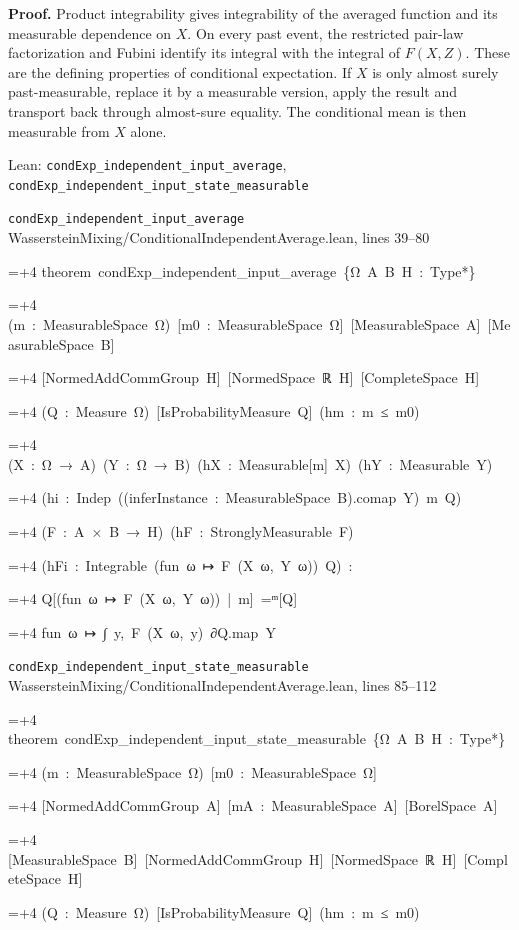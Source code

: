 \documentclass[11pt,a4paper]{report}
\newlength{\leancharwidth}
\newenvironment{leancode}{\par\smallskip\begingroup\ttfamily\footnotesize\raggedright
  \settowidth{\leancharwidth}{M}\setlength{\parskip}{0pt}\setlength{\parindent}{0pt}
  \frenchspacing}{\par\endgroup\smallskip}
\newcommand{\leanline}[2]{\hangindent=\dimexpr#1\leancharwidth+4\leancharwidth\relax
  \hangafter=1\noindent\hspace*{#1\leancharwidth}#2\par}
\newcommand{\leansource}[1]{\par{\footnotesize\color{leanmuted}#1}\par}
\begin{document}
\textbf{Proof.} Product integrability gives integrability of the averaged function and its measurable dependence on \(X\). On every past event, the restricted pair-law factorization and Fubini identify its integral with the integral of \(F(X,Z)\). These are the defining properties of conditional expectation. If \(X\) is only almost surely past-measurable, replace it by a measurable version, apply the result and transport back through almost-sure equality. The conditional mean is then measurable from \(X\) alone.

\begin{leanbox}{Lean: \texttt{condExp\_\allowbreak{}independent\_\allowbreak{}input\_\allowbreak{}average}, \texttt{condExp\_\allowbreak{}independent\_\allowbreak{}input\_\allowbreak{}state\_\allowbreak{}measurable}}
\leansource{\texttt{condExp\_\allowbreak{}independent\_\allowbreak{}input\_\allowbreak{}average} \quad WassersteinMixing/\allowbreak{}ConditionalIndependentAverage.lean, lines 39–80}
\begin{leancode}
\leanline{0}{theorem\ condExp\_independent\_input\_average\ \{Ω\ A\ B\ H\ :\ Type*\}}
\leanline{4}{(m\ :\ MeasurableSpace\ Ω)\ [m0\ :\ MeasurableSpace\ Ω]\ [MeasurableSpace\ A]\ [MeasurableSpace\ B]}
\leanline{4}{[NormedAddCommGroup\ H]\ [NormedSpace\ ℝ\ H]\ [CompleteSpace\ H]}
\leanline{4}{(Q\ :\ Measure\ Ω)\ [IsProbabilityMeasure\ Q]\ (hm\ :\ m\ ≤\ m0)}
\leanline{4}{(X\ :\ Ω\ →\ A)\ (Y\ :\ Ω\ →\ B)\ (hX\ :\ Measurable[m]\ X)\ (hY\ :\ Measurable\ Y)}
\leanline{4}{(hi\ :\ Indep\ ((inferInstance\ :\ MeasurableSpace\ B).comap\ Y)\ m\ Q)}
\leanline{4}{(F\ :\ A\ ×\ B\ →\ H)\ (hF\ :\ StronglyMeasurable\ F)}
\leanline{4}{(hFi\ :\ Integrable\ (fun\ ω\ ↦\ F\ (X\ ω,\ Y\ ω))\ Q)\ :}
\leanline{4}{Q[(fun\ ω\ ↦\ F\ (X\ ω,\ Y\ ω))\ |\ m]\ =ᵐ[Q]}
\leanline{6}{fun\ ω\ ↦\ ∫\ y,\ F\ (X\ ω,\ y)\ ∂Q.map\ Y}
\end{leancode}
\leansource{\texttt{condExp\_\allowbreak{}independent\_\allowbreak{}input\_\allowbreak{}state\_\allowbreak{}measurable} \quad WassersteinMixing/\allowbreak{}ConditionalIndependentAverage.lean, lines 85–112}
\begin{leancode}
\leanline{0}{theorem\ condExp\_independent\_input\_state\_measurable\ \{Ω\ A\ B\ H\ :\ Type*\}}
\leanline{4}{(m\ :\ MeasurableSpace\ Ω)\ [m0\ :\ MeasurableSpace\ Ω]}
\leanline{4}{[NormedAddCommGroup\ A]\ [mA\ :\ MeasurableSpace\ A]\ [BorelSpace\ A]}
\leanline{4}{[MeasurableSpace\ B]\ [NormedAddCommGroup\ H]\ [NormedSpace\ ℝ\ H]\ [CompleteSpace\ H]}
\leanline{4}{(Q\ :\ Measure\ Ω)\ [IsProbabilityMeasure\ Q]\ (hm\ :\ m\ ≤\ m0)}

\end{leancode}
\end{leanbox}
\end{document}
